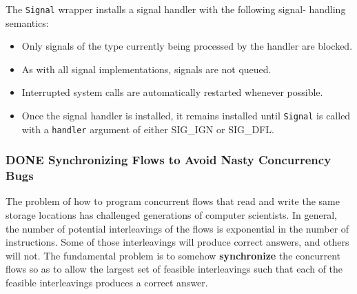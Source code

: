 \documentclass[11pt]{article}
\begin{document}
\begin{enumerate}
The \texttt{Signal} wrapper installs a signal handler with the following signal- handling semantics:\\
\begin{itemize}
\item Only signals of the type currently being processed by the handler are blocked.\\
\item As with all signal implementations, signals are not queued.\\
\item Interrupted system calls are automatically restarted whenever possible.\\
\item Once the signal handler is installed, it remains installed until \texttt{Signal} is called with a \texttt{handler} argument of either SIG\_IGN or SIG\_DFL.\\
\end{itemize}
\end{enumerate}



\subsubsection{{\bfseries\sffamily DONE} Synchronizing Flows to Avoid Nasty Concurrency Bugs}
\label{sec:org579bb9a}
The problem of how to program concurrent flows that read and write the same storage locations has challenged generations of computer scientists. In general, the number of potential interleavings of the flows is exponential in the number of instructions. Some of those interleavings will produce correct answers, and others will not. The fundamental problem is to somehow \textbf{synchronize} the concurrent flows so as to allow the largest set of feasible interleavings such that each of the feasible interleavings produces a correct answer.\\
\end{document}
